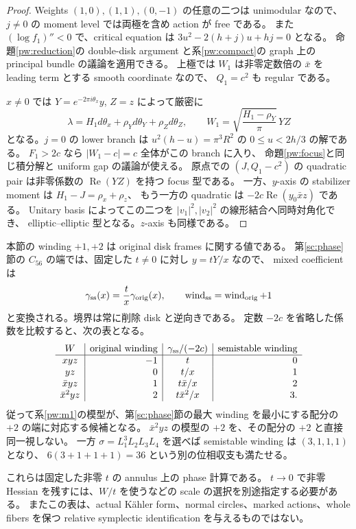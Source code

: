 \begin{proof}
Weights $(1,0),(1,1),(0,-1)$ の任意の二つは unimodular なので、
$j\ne0$ の moment level では両極を含め action が free である。
また $(\log f_1)''<0$ で、critical equation は
$3u^2-2(h+j)u+hj=0$ となる。
命題\ref{pw:reduction}の double-disk argument と系\ref{pw:compact}の
graph 上の principal bundle の議論を適用できる。
上極では $W_1$ は非零定数倍の $\bar x$ を leading term とする smooth coordinate なので、
$Q_1=c^2$ も regular である。

$x\ne0$ では $Y=e^{-2\pi i\theta_x}y$, $Z=z$ によって厳密に
\[
 \lambda=H_1d\theta_x+\rho_Yd\theta_Y+\rho_Zd\theta_Z,
 \qquad W_1=\sqrt{\frac{H_1-\rho_Y}{\pi}}\,YZ
\]
となる。$j=0$ の lower branch は
$u^2(h-u)=\pi^3R^2$ の $0\le u<2h/3$ の解である。
$F_1>2c$ なら $|W_1-c|=c$ 全体がこの branch に入り、
命題\ref{pw:focus}と同じ積分解と uniform gap の議論が使える。
原点での $(J,Q_1-c^2)$ の quadratic pair は非零係数の $\operatorname{Re}(YZ)$ を持つ focus 型である。
一方、$y$-axis の stabilizer moment は $H_1-J=\rho_x+\rho_z$、
もう一方の quadratic は $-2c\operatorname{Re}(y_0\bar xz)$ である。
Unitary basis によってこの二つを $|v_1|^2,|v_2|^2$ の線形結合へ同時対角化でき、
elliptic--elliptic 型となる。$z$-axis も同様である。
\end{proof}

\begin{remark}
\label{pw:semistable-phase}
本節の winding $+1,+2$ は original disk frames に関する値である。
第\ref{sc:phase}節の $C_{56}$ の端では、固定した $t\ne0$ に対し $y=tY/x$ なので、
mixed coefficient は
\[
 \gamma_{\rm ss}(x)=\frac{t}{x}\gamma_{\rm orig}(x),\qquad
 \operatorname{wind}_{\rm ss}=\operatorname{wind}_{\rm orig}+1
\]
と変換される。境界は常に削除 disk と逆向きである。
定数 $-2c$ を省略した係数を比較すると、次の表となる。
\[
\begin{array}{c|r|c|r}
 W&\text{original winding}&\gamma_{\rm ss}/(-2c)&\text{semistable winding}\\ \hline
 xyz&-1&t&0\\
 yz&0&t/x&1\\
 \bar xyz&1&t\bar x/x&2\\
 \bar x^2yz&2&t\bar x^2/x&3.
\end{array}
\]
従って系\ref{pw:m1}の模型が、第\ref{sc:phase}節の最大 winding を最小にする配分の
$+2$ の端に対応する候補となる。
$\bar x^2yz$ の模型の $+2$ を、その配分の $+2$ と直接同一視しない。
一方 $\sigma=L_1^3L_2L_3L_4$ を選べば semistable winding は $(3,1,1,1)$ となり、
$6(3+1+1+1)=36$ という別の位相収支も満たせる。

これらは固定した非零 $t$ の annulus 上の phase 計算である。
$t\to0$ で非零 Hessian を残すには、$W/t$ を使うなどの scale の選択を別途指定する必要がある。
またこの表は、actual Kähler form、normal circles、marked actions、whole fibers を保つ
relative symplectic identification を与えるものではない。
\end{remark}

